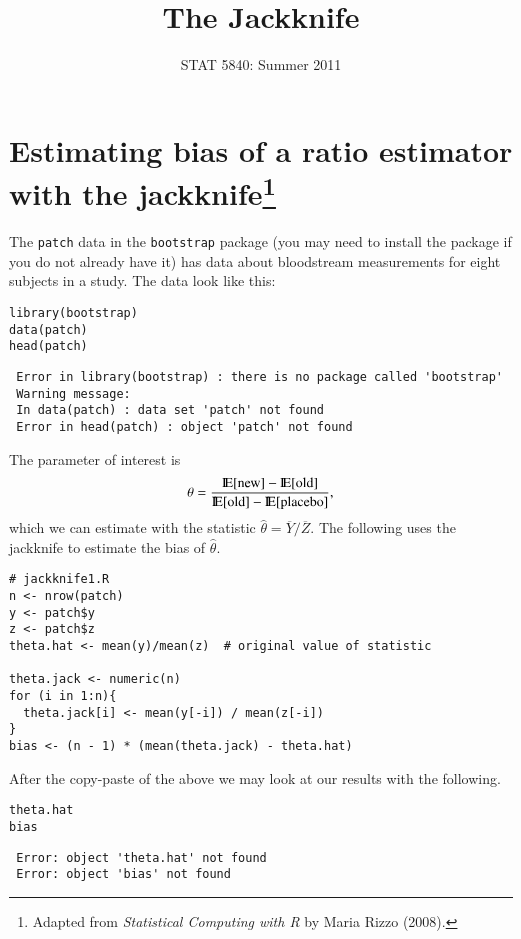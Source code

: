 \documentclass[11pt,english]{article}
\title{The Jackknife}
\date{STAT 5840: Summer 2011}
\begin{document}
\maketitle

\thispagestyle{empty}

\section*{Estimating bias of a ratio estimator with the jackknife\footnote{Adapted from \emph{Statistical Computing with R} by Maria Rizzo (2008). }}
\label{sec-1}

The \texttt{patch} data in the \texttt{bootstrap} package (you may need to install the package if you do not already have it) has data about bloodstream measurements for eight subjects in a study.  The data look like this:

\begin{verbatim}
library(bootstrap)
data(patch)
head(patch)
\end{verbatim}




\begin{verbatim}
 Error in library(bootstrap) : there is no package called 'bootstrap'
 Warning message:
 In data(patch) : data set 'patch' not found
 Error in head(patch) : object 'patch' not found
\end{verbatim}


The parameter of interest is
\[
\theta = \frac{\mathrm{I\hspace{-1.5pt}E}[\mathrm{new}] - \mathrm{I\hspace{-1.5pt}E}[\mathrm{old}]}{\mathrm{I\hspace{-1.5pt}E}[\mathrm{old}] - \mathrm{I\hspace{-1.5pt}E}[\mathrm{placebo}]},
\]
which we can estimate with the statistic \(\hat{\theta} = \overline{Y}/\overline{Z}\).  The following uses the jackknife to estimate the bias of $\hat{\theta}$.


\begin{verbatim}
# jackknife1.R
n <- nrow(patch)
y <- patch$y
z <- patch$z
theta.hat <- mean(y)/mean(z)  # original value of statistic

theta.jack <- numeric(n)
for (i in 1:n){
  theta.jack[i] <- mean(y[-i]) / mean(z[-i])
}
bias <- (n - 1) * (mean(theta.jack) - theta.hat)
\end{verbatim}




After the copy-paste of the above we may look at our results with the following.

\begin{verbatim}
theta.hat
bias
\end{verbatim}




\begin{verbatim}
 Error: object 'theta.hat' not found
 Error: object 'bias' not found
\end{verbatim}
\end{document}
